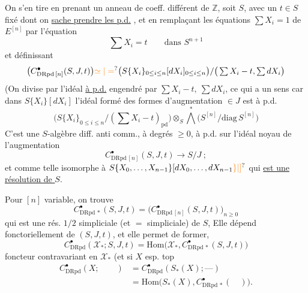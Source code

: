 On s'en tire en prenant un anneau de coeff. différent de $\mathbb Z$, soit $S$, avec un  $t\in S$ fixé dont on \uline{sache prendre les p.d.} , et en remplaçant les équations $\sum X_i=1$ de $E^{[n]}$ par l'équation
\[
\sum X_i=t\qquad\text{dans } S^{n+1}
\]
et définissant
\[
\big(C^\bullet_{\mathrm{DRpd}\,[n]}(S,J,t)\big)\unsure{\simeq|=}
\big(S\{X_i\}_{0\leq i\leq n}[dX_i]_{0\leq i\leq n}\big)/
\big(\textstyle\sum X_i-t,\sum dX_i\big)
\]
(On divise par l'idéal \uline{à p.d.} engendré  par $\sum X_i-t,\ \sum dX_i$, ce qui a un sens
car dans $S\{X_i\}[dX_i]$ l'idéal formé des formes  d'augmentation $\in J$ est à p.d.
\[
\big(S\{X_i\}_{0\leq i\leq n}/(\textstyle\sum X_i-t)_{\mathrm{pd}}\big)
\otimes_S\bigwedge^{\ast}\big(S^{[n]}/\mathrm{diag}\,S^{[n]}\big)
\]
C'est une $S$-algèbre diff.  anti comm., à degrés $\geq 0$,  à p.d. sur l'idéal  noyau de l'augmentation
\[
C^{\bullet}_{\mathrm{DRpd}\,[n]}(S,J,t)\longrightarrow S/J\ ;
\]
et comme telle isomorphe à $S\{X_0,\ldots,X_{n-1}\}[dX_0,\ldots,dX_{n-1}\unsure{\}|\mathclose{]}}$ qui \uline{est une résolution de $S$}. 

Pour $[n]$ variable, on trouve
\[
C^{\bullet}_{\mathrm{DRpd}\,\ast}(S,J,t)=
\big(C^{\bullet}_{\mathrm{DRpd}\,[n]}(S,J,t)\big)_{n\geq 0}
\]
qui est une rés. $1/2$ simpliciale (et $=$ simpliciale) de $S$,  Elle dépend fonctoriellement de $(S,J,t)$, et elle permet de former, 
\[
C^{\bullet}_{\mathrm{DRpd}}(\mathscr X_{\ast};S,J,t)=\mathrm{Hom}\big(\mathscr X_{\ast},C^{\bullet}_{\mathrm{DRpd}\,\ast}(S,J,t)\big)
\]
foncteur contravariant en $\mathscr X_{\ast}$\unsure{!} (et si $X$ esp. top
\[
\begin{aligned}
C^{\bullet}_{\mathrm{DRpd}}(X;\qquad)&=C^{\bullet}_{\mathrm{DRpd}}(S_{\ast}(X);\text{---})\\
&=\mathrm{Hom}\big(S_{\ast}(X),C^{\bullet}_{\mathrm{DRpd}\,\ast}(\quad)\big).
\end{aligned}
\]

